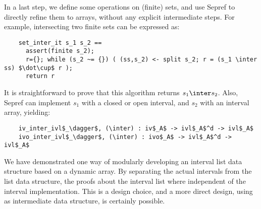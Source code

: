 \documentclass[sn-mathphys,Numbered]{sn-jnl}
\theoremstyle{thmstyleone}%
\theoremstyle{definition}%
\theoremstyle{thmstylethree}%
\begin{document}
  In a last step, we define some operations on (finite) sets, and use Sepref to directly refine them to arrays, without any explicit intermediate steps.
  For example, intersecting two finite sets can be expressed as:
  \begin{lstlisting}
    set_inter_it s_1 s_2 ==
      assert(finite s_2);
      r={}; while (s_2 ~= {}) ( (ss,s_2) <- split s_2; r = (s_1 \inter ss) $\dot\cup$ r );
      return r
  \end{lstlisting}
  It is straightforward to prove that this algorithm returns \is$s_1 \inter s_2$.
  Also, Sepref can implement $s_1$ with a closed or open interval, and $s_2$ with an interval array, yielding:
  \begin{lstlisting}
    iv_inter_ivl$_\dagger$, (\inter) : iv$_A$ -> ivl$_A$^d -> ivl$_A$
    ivo_inter_ivl$_\dagger$, (\inter) : ivo$_A$ -> ivl$_A$^d -> ivl$_A$
  \end{lstlisting}

  We have demonstrated one way of modularly developing an interval list data structure based on a dynamic array.
  By separating the actual intervals from the list data structure, the proofs about the interval
  list where independent of the interval implementation.
  This is a design choice, and a more direct design, using  as intermediate data structure, is certainly possible.
\end{document}
